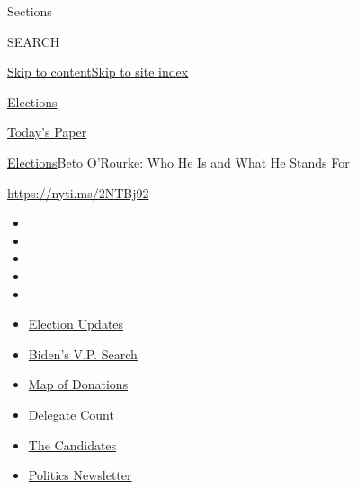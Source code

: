 Sections

SEARCH

\protect\hyperlink{site-content}{Skip to
content}\protect\hyperlink{site-index}{Skip to site index}

\href{https://www.nytimes.com/news-event/2020-election}{Elections}

\href{https://myaccount.nytimes.com/auth/login?response_type=cookie\&client_id=vi}{}

\href{https://www.nytimes.com/section/todayspaper}{Today's Paper}

\href{/news-event/2020-election}{Elections}\textbar{}Beto O'Rourke: Who
He Is and What He Stands For

\url{https://nyti.ms/2NTBj92}

\begin{itemize}
\item
\item
\item
\item
\item
\end{itemize}

\begin{itemize}
\item
  \href{https://www.nytimes.com/2020/07/31/us/elections/biden-vs-trump.html?action=click\&pgtype=Article\&state=default\&region=TOP_BANNER\&context=storylines_menu}{Election
  Updates}
\item
  \href{https://www.nytimes.com/article/biden-vice-president-2020.html?action=click\&pgtype=Article\&state=default\&region=TOP_BANNER\&context=storylines_menu}{Biden's
  V.P. Search}
\item
  \href{https://www.nytimes.com/interactive/2020/07/24/us/politics/trump-biden-campaign-donors.html?action=click\&pgtype=Article\&state=default\&region=TOP_BANNER\&context=storylines_menu}{Map
  of Donations}
\item
  \href{https://www.nytimes.com/interactive/2020/us/elections/delegate-count-primary-results.html?action=click\&pgtype=Article\&state=default\&region=TOP_BANNER\&context=storylines_menu}{Delegate
  Count}
\item
  \href{https://www.nytimes.com/interactive/2019/us/politics/2020-presidential-candidates.html?action=click\&pgtype=Article\&state=default\&region=TOP_BANNER\&context=storylines_menu}{The
  Candidates}
\item
  \href{https://www.nytimes.com/newsletters/politics?action=click\&pgtype=Article\&state=default\&region=TOP_BANNER\&context=storylines_menu}{Politics
  Newsletter}
\end{itemize}

